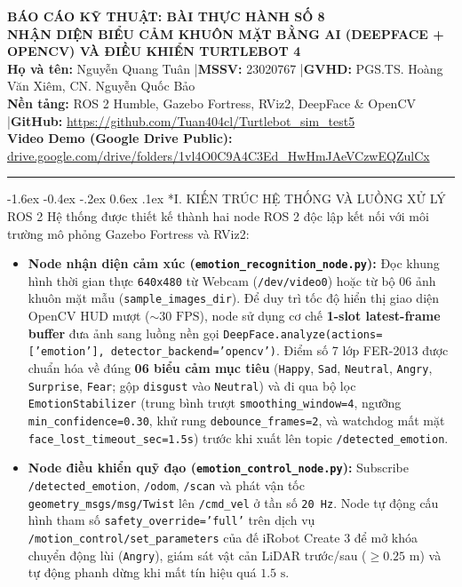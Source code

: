 \documentclass[10pt,a4paper]{article}
\makeatletter
\renewcommand{\section}{\@startsection{section}{1}{\z@}%
  {-1.6ex \@plus -0.4ex \@minus -.2ex}%
  {0.6ex \@plus .1ex}%
  {\normalfont\normalsize\bfseries\color{primary}}}
\makeatother
\begin{document}
\begin{center}
  {\large\bfseries\color{primary} BÁO CÁO KỸ THUẬT: BÀI THỰC HÀNH SỐ 8}\\[2pt]
  {\large\bfseries\color{primary} NHẬN DIỆN BIỂU CẢM KHUÔN MẶT BẰNG AI (DEEPFACE + OPENCV) VÀ ĐIỀU KHIỂN TURTLEBOT 4}\\[4pt]
  {\footnotesize \textbf{Họ và tên:} Nguyễn Quang Tuân \quad|\quad \textbf{MSSV:} 23020767 \quad|\quad \textbf{GVHD:} PGS.TS. Hoàng Văn Xiêm, CN. Nguyễn Quốc Bảo}\\
  {\footnotesize \textbf{Nền tảng:} ROS 2 Humble, Gazebo Fortress, RViz2, DeepFace \& OpenCV \quad|\quad \textbf{GitHub:} \url{https://github.com/Tuan404cl/Turtlebot_sim_test5}}\\
  {\footnotesize \textbf{Video Demo (Google Drive Public):} \href{https://drive.google.com/drive/folders/1vl4O0C9A4C3Ed_HwHmJAeVCzwEQZulCx?usp=drive_link}{drive.google.com/drive/folders/1vl4O0C9A4C3Ed\_HwHmJAeVCzwEQZulCx}}
\end{center}
\vspace{-4pt}
\noindent\rule{\textwidth}{0.6pt}

\section*{I. KIẾN TRÚC HỆ THỐNG VÀ LUỒNG XỬ LÝ ROS 2}
Hệ thống được thiết kế thành hai node ROS 2 độc lập kết nối với môi trường mô phỏng Gazebo Fortress và RViz2:
\begin{itemize}[leftmargin=14pt, itemsep=1pt, topsep=2pt]
  \item \textbf{Node nhận diện cảm xúc (\texttt{emotion\_recognition\_node.py}):} Đọc khung hình thời gian thực \texttt{640x480} từ Webcam (\texttt{/dev/video0}) hoặc từ bộ 06 ảnh khuôn mặt mẫu (\texttt{sample\_images\_dir}). Để duy trì tốc độ hiển thị giao diện OpenCV HUD mượt ($\sim 30\text{ FPS}$), node sử dụng cơ chế \textbf{1-slot latest-frame buffer} đưa ảnh sang luồng nền gọi \texttt{DeepFace.analyze(actions=['emotion'], detector\_backend='opencv')}. Điểm số 7 lớp FER-2013 được chuẩn hóa về đúng \textbf{06 biểu cảm mục tiêu} (\texttt{Happy}, \texttt{Sad}, \texttt{Neutral}, \texttt{Angry}, \texttt{Surprise}, \texttt{Fear}; gộp \texttt{disgust} vào \texttt{Neutral}) và đi qua bộ lọc \texttt{EmotionStabilizer} (trung bình trượt \texttt{smoothing\_window=4}, ngưỡng \texttt{min\_confidence=0.30}, khử rung \texttt{debounce\_frames=2}, và watchdog mất mặt \texttt{face\_lost\_timeout\_sec=1.5s}) trước khi xuất lên topic \texttt{/detected\_emotion}.
  \item \textbf{Node điều khiển quỹ đạo (\texttt{emotion\_control\_node.py}):} Subscribe \texttt{/detected\_emotion}, \texttt{/odom}, \texttt{/scan} và phát vận tốc \texttt{geometry\_msgs/msg/Twist} lên \texttt{/cmd\_vel} ở tần số \texttt{20 Hz}. Node tự động cấu hình tham số \texttt{safety\_override='full'} trên dịch vụ \texttt{/motion\_control/set\_parameters} của đế iRobot Create 3 để mở khóa chuyển động lùi (\texttt{Angry}), giám sát vật cản LiDAR trước/sau ($\ge 0.25\text{ m}$) và tự động phanh dừng khi mất tín hiệu quá $1.5\text{ s}$.
\end{itemize}
\end{document}
